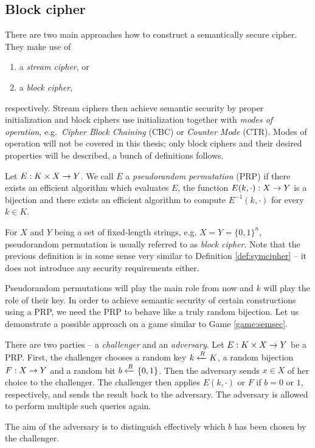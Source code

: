 
\subsection{Block cipher}

There are two main approaches how to construct a semantically secure cipher. They make use of
\begin{enumerate}
	\item a {\em stream cipher}, or
	\item a {\em block cipher},
\end{enumerate}
respectively. Stream ciphers then achieve semantic security by proper initialization and block ciphers use initialization together with {\em modes of operation}, e.g.\ {\em Cipher Block Chaining} (CBC) or {\em Counter Mode} (CTR). Modes of operation will not be covered in this thesis; only block ciphers and their desired properties will be described, a bunch of definitions follows.

\begin{defn}
\label{def:prp}
	Let $E: K\times X\rightarrow Y$. We call $E$ a {\em pseudorandom permutation} (PRP) if there exists an efficient algorithm which evaluates $E$, the function $E(k,\cdot): X\rightarrow Y$ is a bijection and there exists an efficient algorithm to compute $E^{-1}(k,\cdot)$ for every $k\in K$.
\end{defn}

\begin{note}
	For $X$ and $Y$ being a set of fixed-length strings, e.g. $X = Y = \{0,1\}^n$, pseudorandom permutation is usually referred to as {\em block cipher}. Note that the previous definition is in some sense very similar to Definition \ref{def:symcipher} -- it does not introduce any security requirements either.
\end{note}

Pseudorandom permutations will play the main role from now and $k$ will play the role of their key. In order to achieve semantic security of certain constructions using a PRP, we need the PRP to behave like a truly random bijection. Let us demonstrate a possible approach on a game similar to Game \ref{game:semsec}.

\begin{game}
\label{game:prp}
	There are two parties -- a {\em challenger} and an {\em adversary}. Let $E:K\times X\rightarrow Y$ be a PRP. First, the challenger chooses a random key $k\xleftarrow{R} K$, a random bijection $F:X\rightarrow Y$ and a random bit $b\xleftarrow{R}\{0,1\}$. Then the adversary sends $x\in X$ of her choice to the challenger. The challenger then applies $E(k,\cdot)$ or $F$ if $b=0$ or $1$, respectively, and sends the result back to the adversary. The adversary is allowed to perform multiple such queries again.
	
	The aim of the adversary is to distinguish effectively which $b$ has been chosen by the challenger.
\end{game}


